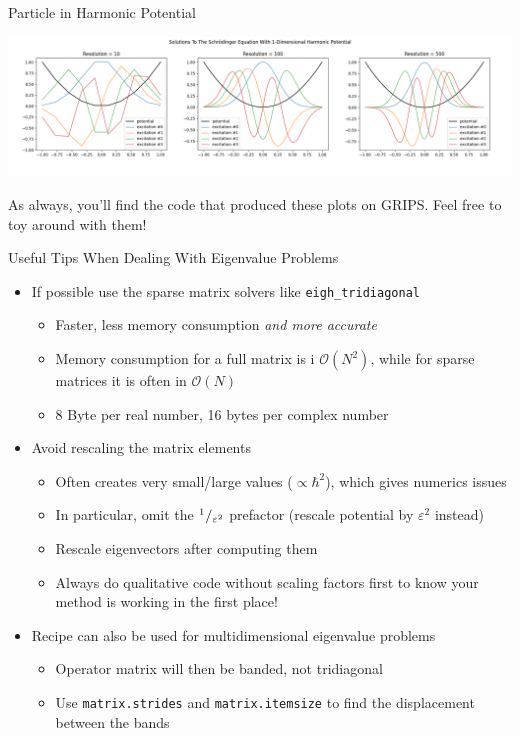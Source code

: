 \begin{frame}{Particle in Harmonic Potential}
%
\begin{center}
\includegraphics[width=\linewidth]{./gfx/07-harmonic-osciallator}
\end{center}
%
\begin{hintbox}
\footnotesize
As always, you'll find the code that produced these plots on GRIPS. Feel free to toy around with them!
\end{hintbox}
%
\end{frame}


\begin{frame}{Useful Tips When Dealing With Eigenvalue Problems}
%
\small
\begin{itemize}
\item If possible use the sparse matrix solvers like \texttt{eigh\_tridiagonal}
	\begin{itemize}
	\item Faster, less memory consumption \emph{and more accurate}
	\item Memory consumption for a full matrix is i $\mathcal{O}(N^2)$, while for sparse matrices it is often in $\mathcal{O}(N)$
	\item 8 Byte per real number, 16 bytes per complex number
	\end{itemize}
\item Avoid rescaling the matrix elements
	\begin{itemize}
	\item Often creates very small/large values ($\propto \hbar^2$), which gives numerics issues
	\item In particular, omit the ${}^{1}/_{\varepsilon^2}$ prefactor (rescale potential by $\varepsilon^2$ instead)
	\item Rescale eigenvectors after computing them
	\item Always do qualitative code without scaling factors first to know your method is working in the first place!
	\end{itemize}
\item Recipe can also be used for multidimensional eigenvalue problems
	\begin{itemize}
	\item Operator matrix will then be banded, not tridiagonal
	\item Use \texttt{matrix.strides} and \texttt{matrix.itemsize} to find the displacement between the bands
	\end{itemize}
\end{itemize}
%
\end{frame}

